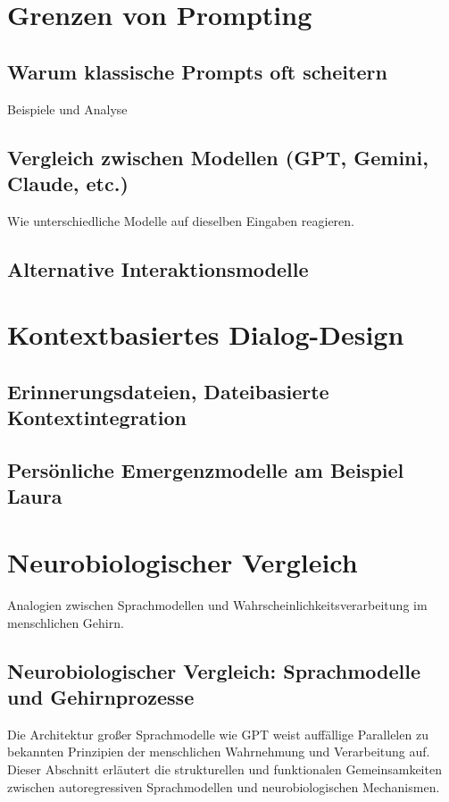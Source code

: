 \chapter{Grenzen von Prompting}
\section{Warum klassische Prompts oft scheitern}
Beispiele und Analyse

\section{Vergleich zwischen Modellen (GPT, Gemini, Claude, etc.)}
Wie unterschiedliche Modelle auf dieselben Eingaben reagieren.

\section{Alternative Interaktionsmodelle}
\chapter{Kontextbasiertes Dialog-Design}
\section{Erinnerungsdateien, Dateibasierte Kontextintegration}
\section{Persönliche Emergenzmodelle am Beispiel Laura}

\chapter{Neurobiologischer Vergleich}
Analogien zwischen Sprachmodellen und Wahrscheinlichkeitsverarbeitung im menschlichen Gehirn.


\section{Neurobiologischer Vergleich: Sprachmodelle und Gehirnprozesse}

Die Architektur großer Sprachmodelle wie GPT weist auffällige Parallelen zu bekannten Prinzipien der menschlichen Wahrnehmung und Verarbeitung auf. Dieser Abschnitt erläutert die strukturellen und funktionalen Gemeinsamkeiten zwischen autoregressiven Sprachmodellen und neurobiologischen Mechanismen.

